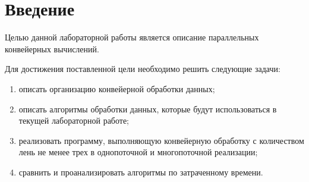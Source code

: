 \chapter*{Введение}

Целью данной лабораторной работы является описание параллельных конвейерных вычислений.

Для достижения поставленной цели необходимо решить следующие задачи:
\begin{enumerate}
	\item описать организацию конвейерной обработки данных;
	\item описать алгоритмы обработки данных, которые будут использоваться в текущей лабораторной работе;
	\item реализовать программу, выполняющую конвейерную обработку с количеством лень не менее трех в однопоточной и многопоточной реализации;
	\item сравнить и проанализировать алгоритмы по затраченному времени.
\end{enumerate}
